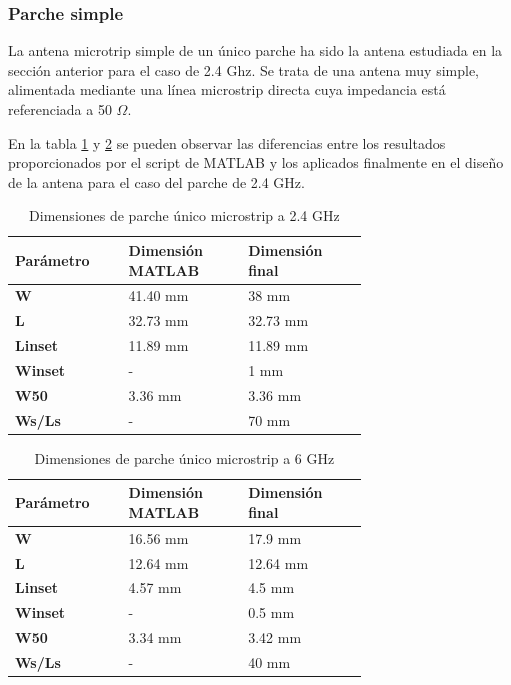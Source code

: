 \subsubsection{Parche simple} 
\par La antena microtrip simple de un único parche ha sido la antena estudiada en la sección anterior para el caso de 2.4 Ghz. Se trata de una antena muy simple, alimentada mediante una línea microstrip directa cuya impedancia está referenciada a 50 $\Omega$.
\\
\par En la tabla \ref{tab:simple1} y \ref{tab:simple2} se pueden observar las diferencias entre los resultados proporcionados por el script de MATLAB y los aplicados finalmente en el diseño de la antena para el caso del parche de 2.4 GHz.

\begin{table}[H]
  
   \label{tab:simple1}
   \small %
   \centering %
   \begin{tabular}{m{0.2\linewidth}m{0.25\linewidth}m{0.25\linewidth}} %
   \toprule[\heavyrulewidth]\toprule[\heavyrulewidth]
   \textbf{Parámetro} & \textbf{Dimensión MATLAB} & \textbf{Dimensión final} \\ 
   \midrule
   \textbf{W} & 41.40 mm & 38 mm \\
   \textbf{L} & 32.73 mm & 32.73 mm\\
   \textbf{Linset} & 11.89 mm & 11.89 mm\\
   \textbf{Winset} & - & 1 mm\\
   \textbf{W50} & 3.36 mm & 3.36 mm\\
   \textbf{Ws/Ls} & - & 70 mm\\
   \bottomrule[\heavyrulewidth] 
   \end{tabular}
   \caption{Dimensiones de parche único microstrip a 2.4 GHz} 
\end{table}

\begin{table}[H]
  
   \label{tab:simple2}
   \small %
   \centering %
   \begin{tabular}{m{0.2\linewidth}m{0.25\linewidth}m{0.25\linewidth}} %
   \toprule[\heavyrulewidth]\toprule[\heavyrulewidth]
   \textbf{Parámetro} & \textbf{Dimensión MATLAB} & \textbf{Dimensión final} \\ 
   \midrule
   \textbf{W} & 16.56 mm & 17.9 mm \\
   \textbf{L} & 12.64 mm & 12.64 mm\\
   \textbf{Linset} & 4.57 mm & 4.5 mm\\
   \textbf{Winset} & - & 0.5 mm\\
   \textbf{W50} & 3.34 mm & 3.42 mm\\
   \textbf{Ws/Ls} & - & 40 mm\\
   \bottomrule[\heavyrulewidth] 
   \end{tabular}
   \caption{Dimensiones de parche único microstrip a 6 GHz} 
\end{table}

